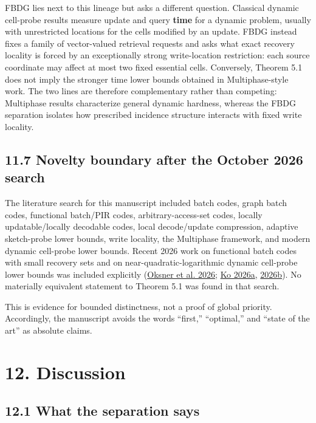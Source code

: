 \documentclass[
]{article}
\begin{document}
FBDG lies next to this lineage but asks a different question. Classical
dynamic cell-probe results measure update and query \textbf{time} for a
dynamic problem, usually with unrestricted locations for the cells
modified by an update. FBDG instead fixes a family of vector-valued
retrieval requests and asks what exact recovery locality is forced by an
exceptionally strong write-location restriction: each source coordinate
may affect at most two fixed essential cells. Conversely, Theorem 5.1
does not imply the stronger time lower bounds obtained in
Multiphase-style work. The two lines are therefore complementary rather
than competing: Multiphase results characterize general dynamic
hardness, whereas the FBDG separation isolates how prescribed incidence
structure interacts with fixed write locality.

\hypertarget{novelty-boundary-after-the-october-2026-search}{%
\subsection{11.7 Novelty boundary after the October 2026
search}\label{novelty-boundary-after-the-october-2026-search}}

The literature search for this manuscript included batch codes, graph
batch codes, functional batch/PIR codes, arbitrary-access-set codes,
locally updatable/locally decodable codes, local decode/update
compression, adaptive sketch-probe lower bounds, write locality, the
Multiphase framework, and modern dynamic cell-probe lower bounds. Recent
2026 work on functional batch codes with small recovery sets and on
near-quadratic-logarithmic dynamic cell-probe lower bounds was included
explicitly (\protect\hyperlink{ref-oksner2026functional}{Oksner et al.
2026}; \protect\hyperlink{ref-ko2026boolean}{Ko 2026a},
\protect\hyperlink{ref-ko2026dynamicgraphs}{2026b}). No materially
equivalent statement to Theorem 5.1 was found in that search.

This is evidence for bounded distinctness, not a proof of global
priority. Accordingly, the manuscript avoids the words ``first,''
``optimal,'' and ``state of the art'' as absolute claims.

\hypertarget{discussion}{%
\section{12. Discussion}\label{discussion}}

\hypertarget{what-the-separation-says}{%
\subsection{12.1 What the separation
says}\label{what-the-separation-says}}
\end{document}
